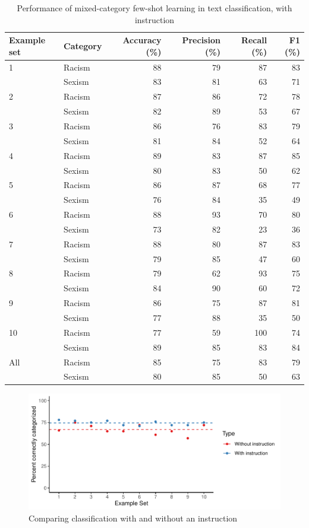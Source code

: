 \documentclass[12pt,]{article}
\begin{document}
\begin{table}

\caption{\label{tab:fewshotmixedinstruct-summary}Performance of mixed-category few-shot learning in text classification, with instruction}
\centering
\begin{tabular}[t]{llrrrr}
\toprule
Example set & Category & Accuracy (\%) & Precision (\%) & Recall (\%) & F1 (\%)\\
\midrule
1 & Racism & 88 & 79 & 87 & 83\\
 & Sexism & 83 & 81 & 63 & 71\\
\midrule
2 & Racism & 87 & 86 & 72 & 78\\
 & Sexism & 82 & 89 & 53 & 67\\
\midrule
3 & Racism & 86 & 76 & 83 & 79\\
 & Sexism & 81 & 84 & 52 & 64\\
\midrule
4 & Racism & 89 & 83 & 87 & 85\\
 & Sexism & 80 & 83 & 50 & 62\\
\midrule
5 & Racism & 86 & 87 & 68 & 77\\
 & Sexism & 76 & 84 & 35 & 49\\
\midrule
6 & Racism & 88 & 93 & 70 & 80\\
 & Sexism & 73 & 82 & 23 & 36\\
\midrule
7 & Racism & 88 & 80 & 87 & 83\\
 & Sexism & 79 & 85 & 47 & 60\\
\midrule
8 & Racism & 79 & 62 & 93 & 75\\
 & Sexism & 84 & 90 & 60 & 72\\
\midrule
9 & Racism & 86 & 75 & 87 & 81\\
 & Sexism & 77 & 88 & 35 & 50\\
\midrule
10 & Racism & 77 & 59 & 100 & 74\\
 & Sexism & 89 & 85 & 83 & 84\\
\midrule
All & Racism & 85 & 75 & 83 & 79\\
 & Sexism & 80 & 85 & 50 & 63\\
\bottomrule
\end{tabular}
\end{table}

\begin{figure}
\centering
\includegraphics{paper_files/figure-latex/comparison-1.pdf}
\caption{\label{fig:comparison}Comparing classification with and without an instruction}
\end{figure}
\end{document}
